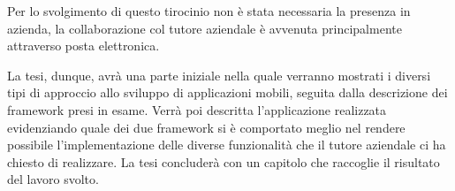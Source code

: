     Per lo svolgimento di questo tirocinio non è stata necessaria la presenza in
    azienda, la collaborazione col tutore aziendale è avvenuta principalmente
    attraverso posta elettronica.

    La tesi, dunque, avrà una parte iniziale nella quale verranno mostrati i
    diversi tipi di approccio allo sviluppo di applicazioni mobili, seguita
    dalla descrizione dei frame\-work presi in esame. Verrà poi descritta
    l'applicazione realizzata evidenziando quale dei due frame\-work si è
    comportato meglio nel rendere possibile l'implementazione delle diverse
    funzionalità che il tutore aziendale ci ha chiesto di realizzare. La tesi
    concluderà con un capitolo che raccoglie il risultato del lavoro svolto.
